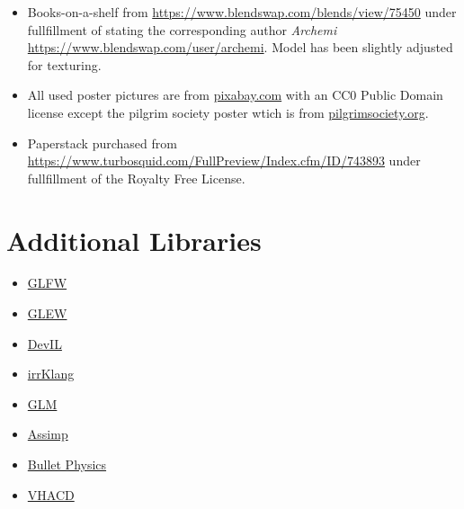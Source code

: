 \documentclass[12pt]{article}
\begin{document}
\begin{itemize}
\item Books-on-a-shelf from \url{https://www.blendswap.com/blends/view/75450} under fullfillment of stating the corresponding author \textit{Archemi} \url{https://www.blendswap.com/user/archemi}. Model has been slightly adjusted for texturing.

\item All used poster pictures are from \href{https://pixabay.com}{pixabay.com} with an CC0 Public Domain license except the pilgrim society poster wtich is from \href{http://www.pilgrimsociety.org/}{pilgrimsociety.org}.

\item Paperstack purchased from \url{https://www.turbosquid.com/FullPreview/Index.cfm/ID/743893} under fullfillment of the Royalty Free License.

\end{itemize}





\section{Additional Libraries}

\begin{itemize}
\item \href{http://www.glfw.org/}{GLFW}
\item \href{http://glew.sourceforge.net/}{GLEW}
\item \href{http://openil.sourceforge.net/}{DevIL}
\item \href{http://www.ambiera.com/irrklang/index.html}{irrKlang}
\item \href{http://glm.g-truc.net}{GLM }
\item \href{http://www.assimp.org}{Assimp}
\item \href{http://bulletphysics.org/}{Bullet Physics}
\item \href{https://github.com/kmammou/v-hacd}{VHACD}
\end{itemize}
\end{document}
